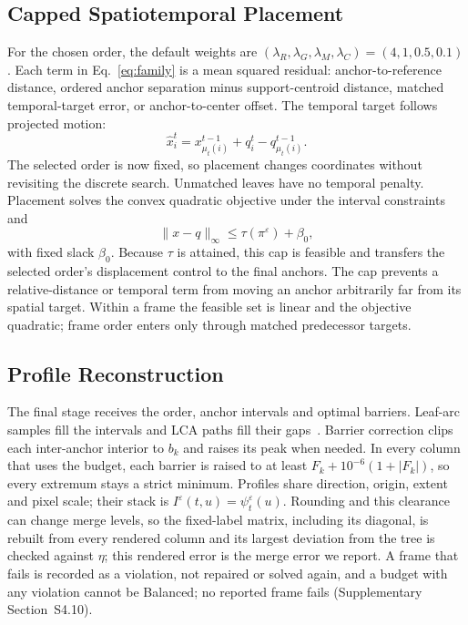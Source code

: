 \subsection{Capped Spatiotemporal Placement}
For the chosen order, the default weights are $(\lambda_R,\lambda_G,\lambda_M,\lambda_C)=(4,1,0.5,0.1)$. Each term in Eq.~\ref{eq:family} is a mean squared residual: anchor-to-reference distance, ordered anchor separation minus support-centroid distance, matched temporal-target error, or anchor-to-center offset. The temporal target follows projected motion:
\begin{equation}\label{eq:temporal_target}
\hat x_i^t=x_{\mu_t(i)}^{t-1}+q_i^t-q_{\mu_t(i)}^{t-1}.
\end{equation}
The selected order is now fixed, so placement changes coordinates without revisiting the discrete search. Unmatched leaves have no temporal penalty. Placement solves the convex quadratic objective under the interval constraints and
\begin{equation}\label{eq:qp}
\|x-q\|_\infty\le\tau(\pi^\varepsilon)+\beta_0,
\end{equation}
with fixed slack $\beta_0$. Because $\tau$ is attained, this cap is feasible and transfers the selected order's displacement control to the final anchors. The cap prevents a relative-distance or temporal term from moving an anchor arbitrarily far from its spatial target. Within a frame the feasible set is linear and the objective quadratic; frame order enters only through matched predecessor targets.

\subsection{Profile Reconstruction}\label{sec:reconstruction}
The final stage receives the order, anchor intervals and optimal barriers. Leaf-arc samples fill the intervals and LCA paths fill their gaps~\cite{Koepp:2023:TMTM,STMTM:2026}. Barrier correction clips each inter-anchor interior to $b_k$ and raises its peak when needed. In every column that uses the budget, each barrier is raised to at least $F_k+10^{-6}(1+|F_k|)$, so every extremum stays a strict minimum. Profiles share direction, origin, extent and pixel scale; their stack is $I^\varepsilon(t,u)=\psi_t^\varepsilon(u)$. Rounding and this clearance can change merge levels, so the fixed-label matrix, including its diagonal, is rebuilt from every rendered column and its largest deviation from the tree is checked against $\eta$; this rendered error is the merge error we report. A frame that fails is recorded as a violation, not repaired or solved again, and a budget with any violation cannot be Balanced; no reported frame fails (Supplementary Section~S4.10).